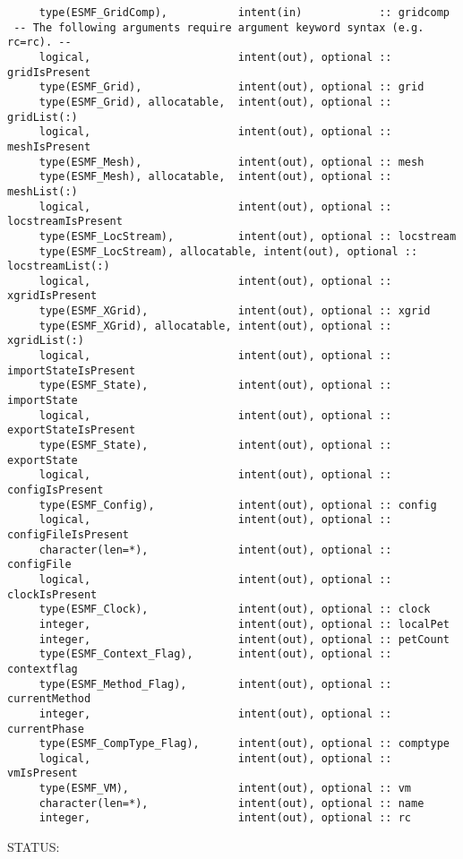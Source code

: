\begin{verbatim}     type(ESMF_GridComp),           intent(in)            :: gridcomp
 -- The following arguments require argument keyword syntax (e.g. rc=rc). --
     logical,                       intent(out), optional :: gridIsPresent
     type(ESMF_Grid),               intent(out), optional :: grid
     type(ESMF_Grid), allocatable,  intent(out), optional :: gridList(:)
     logical,                       intent(out), optional :: meshIsPresent
     type(ESMF_Mesh),               intent(out), optional :: mesh
     type(ESMF_Mesh), allocatable,  intent(out), optional :: meshList(:)
     logical,                       intent(out), optional :: locstreamIsPresent
     type(ESMF_LocStream),          intent(out), optional :: locstream
     type(ESMF_LocStream), allocatable, intent(out), optional :: locstreamList(:)
     logical,                       intent(out), optional :: xgridIsPresent
     type(ESMF_XGrid),              intent(out), optional :: xgrid
     type(ESMF_XGrid), allocatable, intent(out), optional :: xgridList(:)
     logical,                       intent(out), optional :: importStateIsPresent
     type(ESMF_State),              intent(out), optional :: importState
     logical,                       intent(out), optional :: exportStateIsPresent
     type(ESMF_State),              intent(out), optional :: exportState
     logical,                       intent(out), optional :: configIsPresent
     type(ESMF_Config),             intent(out), optional :: config
     logical,                       intent(out), optional :: configFileIsPresent
     character(len=*),              intent(out), optional :: configFile
     logical,                       intent(out), optional :: clockIsPresent
     type(ESMF_Clock),              intent(out), optional :: clock
     integer,                       intent(out), optional :: localPet
     integer,                       intent(out), optional :: petCount
     type(ESMF_Context_Flag),       intent(out), optional :: contextflag
     type(ESMF_Method_Flag),        intent(out), optional :: currentMethod
     integer,                       intent(out), optional :: currentPhase
     type(ESMF_CompType_Flag),      intent(out), optional :: comptype
     logical,                       intent(out), optional :: vmIsPresent
     type(ESMF_VM),                 intent(out), optional :: vm
     character(len=*),              intent(out), optional :: name
     integer,                       intent(out), optional :: rc\end{verbatim}
{\sf STATUS:}
